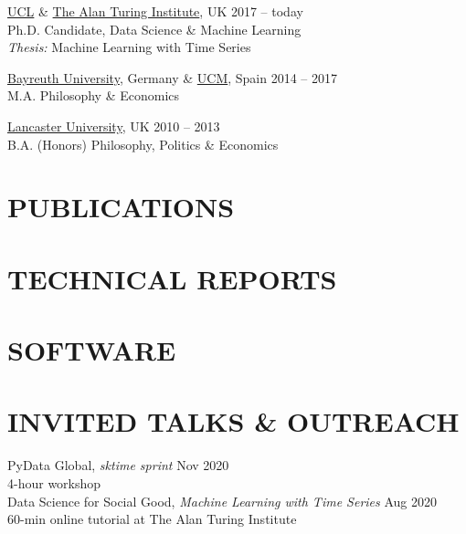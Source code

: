 \documentclass{cv}
\newcommand{\printbibsection}[2]{
\begin{refsection}
\nocite{*}
\printbibliography[sorting=chronological,
                  type={#1},
                  title={#2},
                  heading=none]
\end{refsection}
}
\begin{document}
\href{https://www.ucl.ac.uk/}{UCL} \& \href{https://www.turing.ac.uk/}{The Alan Turing Institute}, UK \hfill 2017 -- today \\
Ph.D. Candidate, Data Science \& Machine Learning \\
{\color{lightgray} \emph{Thesis:} Machine Learning with Time Series} %
\vspace{15pt}

\href{https://www.uni-bayreuth.de/en/}{Bayreuth University}, Germany \& \href{https://www.ucm.es/english}{UCM}, Spain \hfill 2014 -- 2017 \\
M.A. Philosophy \& Economics 
\vspace{15pt}

\href{https://www.lancs.ac.uk/}{Lancaster University}, UK \hfill 2010 -- 2013 \\
B.A. (Honors) Philosophy, Politics \& Economics \\


\section{PUBLICATIONS}
\printbibsection{article}{}

\section{TECHNICAL REPORTS}
\printbibsection{proceedings}{}

\section{SOFTWARE}
\printbibsection{misc}{}

\section{INVITED TALKS \& OUTREACH}

PyData Global, \textit{sktime sprint} \hfill Nov 2020 \\
{\color{lightgray} 4-hour workshop} \\

Data Science for Social Good, \textit{Machine Learning with Time Series} \hfill Aug 2020 \\
{\color{lightgray} 60-min online tutorial at The Alan Turing Institute} \\
\end{document}
